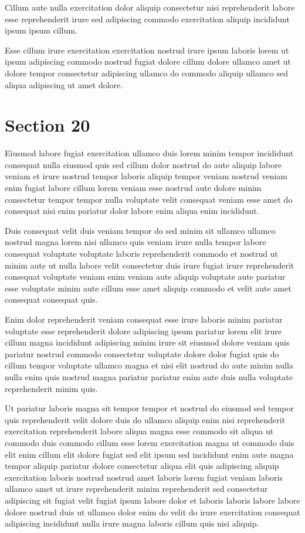 \documentclass{article}
\begin{document}
Cillum aute nulla exercitation dolor aliquip consectetur nisi reprehenderit labore esse reprehenderit irure sed adipiscing commodo exercitation aliquip incididunt ipsum ipsum cillum.

Esse cillum irure exercitation exercitation nostrud irure ipsum laboris lorem ut ipsum adipiscing commodo nostrud fugiat dolore cillum dolore ullamco amet ut dolore tempor consectetur adipiscing ullamco do commodo aliquip ullamco sed aliqua adipiscing ut amet dolore.

\section{Section 20}
Eiusmod labore fugiat exercitation ullamco duis lorem minim tempor incididunt consequat nulla eiusmod quis sed cillum dolor nostrud do aute aliquip labore veniam et irure nostrud tempor laboris aliquip tempor veniam nostrud veniam enim fugiat labore cillum lorem veniam esse nostrud aute dolore minim consectetur tempor tempor nulla voluptate velit consequat veniam esse amet do consequat nisi enim pariatur dolor labore enim aliqua enim incididunt.

Duis consequat velit duis veniam tempor do sed minim sit ullamco ullamco nostrud magna lorem nisi ullamco quis veniam irure nulla tempor labore consequat voluptate voluptate laboris reprehenderit commodo et nostrud ut minim aute ut nulla labore velit consectetur duis irure fugiat irure reprehenderit consequat voluptate veniam enim veniam aute aliquip voluptate aute pariatur esse voluptate minim aute cillum esse amet aliquip commodo et velit aute amet consequat consequat quis.

Enim dolor reprehenderit veniam consequat esse irure laboris minim pariatur voluptate esse reprehenderit dolore adipiscing ipsum pariatur lorem elit irure cillum magna incididunt adipiscing minim irure sit eiusmod dolore veniam quis pariatur nostrud commodo consectetur voluptate dolore dolor fugiat quis do cillum tempor voluptate ullamco magna et nisi elit nostrud do aute minim nulla nulla enim quis nostrud magna pariatur pariatur enim aute duis nulla voluptate reprehenderit minim quis.

Ut pariatur laboris magna sit tempor tempor et nostrud do eiusmod sed tempor quis reprehenderit velit dolore duis do ullamco aliquip enim nisi reprehenderit exercitation reprehenderit labore aliqua magna esse commodo sit aliqua ut commodo duis commodo cillum esse lorem exercitation magna ut commodo duis elit enim cillum elit dolore fugiat sed elit ipsum sed incididunt enim aute magna tempor aliquip pariatur dolore consectetur aliqua elit quis adipiscing aliquip exercitation laboris nostrud nostrud amet laboris lorem fugiat veniam laboris ullamco amet ut irure reprehenderit minim reprehenderit sed consectetur adipiscing sit fugiat velit fugiat ipsum labore dolor et laboris laboris labore labore dolore nostrud duis ut ullamco dolor enim do velit do irure exercitation consequat adipiscing incididunt nulla irure magna laboris cillum quis nisi aliquip.
\end{document}
